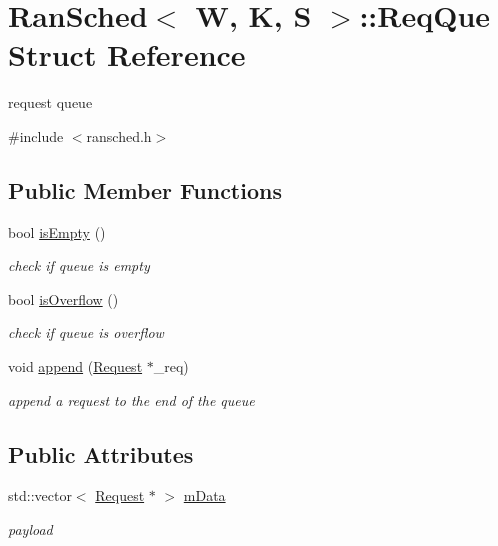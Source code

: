 \hypertarget{structRanSched_1_1ReqQue}{\section{Ran\-Sched$<$ W, K, S $>$\-:\-:Req\-Que Struct Reference}
\label{structRanSched_1_1ReqQue}
}


request queue  




{\ttfamily \#include $<$ransched.\-h$>$}

\subsection*{Public Member Functions}
\begin{DoxyCompactItemize}
\item 
bool \hyperlink{structRanSched_1_1ReqQue_a27576b7c3776b186315f880353647abb}{is\-Empty} ()
\begin{DoxyCompactList}\small\item\em check if queue is empty \end{DoxyCompactList}\item 
bool \hyperlink{structRanSched_1_1ReqQue_a4f1e73e363637215d681d79b0689720a}{is\-Overflow} ()
\begin{DoxyCompactList}\small\item\em check if queue is overflow \end{DoxyCompactList}\item 
void \hyperlink{structRanSched_1_1ReqQue_a56028232fc5467320506aba6d63ca476}{append} (\hyperlink{structRanSched_1_1Request}{Request} $\ast$\-\_\-req)
\begin{DoxyCompactList}\small\item\em append a request to the end of the queue \end{DoxyCompactList}\end{DoxyCompactItemize}
\subsection*{Public Attributes}
\begin{DoxyCompactItemize}
\item 
std\-::vector$<$ \hyperlink{structRanSched_1_1Request}{Request} $\ast$ $>$ \hyperlink{structRanSched_1_1ReqQue_afffb020b5e1c36b3c9746252cee7ec7e}{m\-Data}
\begin{DoxyCompactList}\small\item\em payload \end{DoxyCompactList}\end{DoxyCompactItemize}


